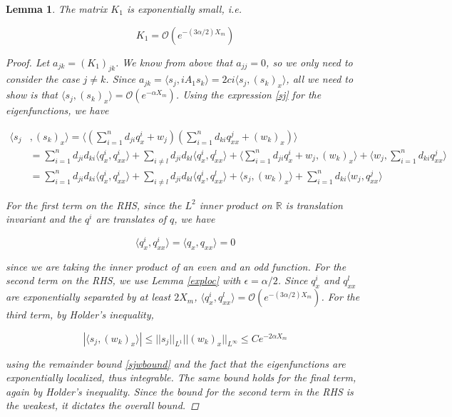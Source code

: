 \documentclass[12pt]{article}
\def\R{{\mathbb R}}
\newtheorem{lemma}{Lemma}
\begin{document}
\begin{lemma}\label{K1small}
The matrix $K_1$ is exponentially small, i.e. 

\begin{equation}
K_1 = \mathcal{O}(e^{-(3 \alpha/2) X_m} )
\end{equation}

\begin{proof}

Let $a_{jk} = (K_1)_{jk}$. We know from above that $a_{jj} = 0$, so we only need to consider the case $j \neq k$. Since $a_{jk} = \langle s_j, i A_1 s_k\rangle = 2 c i \langle s_j, (s_k)_x \rangle$, all we need to show is that $\langle s_j, (s_k)_x \rangle = \mathcal{O}(e^{-\alpha X_m})$. Using the expression \eqref{sj} for the eigenfunctions, we have

\begin{align*}
\langle s_j &, (s_k)_x \rangle = 
\langle \left( \sum_{i = 1}^{n} d_{ji} q^i_x + w_j \right) \left( \sum_{i = 1}^{n} d_{ki} q^j_{xx} + (w_k)_x \right) \rangle \\
&= \sum_{i = 1}^{n} d_{ji} d_{ki} \langle q^i_x, q^i_{xx} \rangle 
+ \sum_{i \neq l} d_{ji} d_{kl} \langle q^i_x, q^l_{xx} \rangle 
+ \langle \sum_{i = 1}^{n} d_{ji} q^i_x + w_j, (w_k)_x \rangle 
+ \langle w_j, \sum_{i = 1}^{n} d_{ki} q^j_{xx} \rangle \\
&= \sum_{i = 1}^{n} d_{ji} d_{ki} \langle q^i_x, q^i_{xx} \rangle 
+ \sum_{i \neq l} d_{ji} d_{kl} \langle q^i_x, q^l_{xx} \rangle 
+ \langle s_j, (w_k)_x \rangle 
+ \sum_{i = 1}^{n} d_{ki} \langle w_j, q^j_{xx} \rangle
\end{align*}  

For the first term on the RHS, since the $L^2$ inner product on $\R$ is translation invariant and the $q^i$ are translates of $q$, we have

\[
\langle q^i_x, q^i_{xx} \rangle = \langle q_x, q_{xx} \rangle = 0
\] 

since we are taking the inner product of an even and an odd function. For the second term on the RHS, we use Lemma \ref{exploc} with $\epsilon = \alpha / 2$. Since $q^i_x$ and $q^l_{xx}$ are exponentially separated by at least $2 X_m$, $\langle q^i_x, q^l_{xx} \rangle = \mathcal{O}(e^{-(3 \alpha/2) X_m})$. For the third term, by Holder's inequality,

\[
|\langle s_j, (w_k)_x \rangle| \leq ||s_j||_{L^1} ||(w_k)_x||_{L^\infty} \leq C e^{-2 \alpha X_m}
\]

using the remainder bound \eqref{sjwbound} and the fact that the eigenfunctions are exponentially localized, thus integrable. The same bound holds for the final term, again by Holder's inequality. Since the bound for the second term in the RHS is the weakest, it dictates the overall bound.

\end{proof}
\end{lemma}
\end{document}
